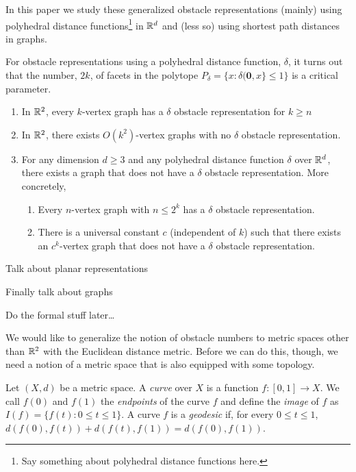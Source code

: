 \documentclass{patmorin}
\begin{document}
In this paper we study these generalized obstacle representations
(mainly) using polyhedral distance functions\footnote{Say something
about polyhedral distance functions here.} in $\mathbb{R}^d$ and (less so)
using shortest path distances in graphs.  

For obstacle representations using a polyhedral distance function, $\delta$,
it turns out that the number, $2k$, of facets in the polytope $P_\delta=\{ x: \delta(\mathbf{0},x\}\le 1\}$ is a critical parameter. 

\begin{enumerate}
  \item In $\mathbb{R}^2$, every $k$-vertex graph has a $\delta$ obstacle
  representation for $k\ge n$

  \item In $\mathbb{R}^2$, there exists $O(k^2)$-vertex graphs with no $\delta$
  obstacle representation.

  \item For any dimension $d\ge 3$ and any polyhedral distance function
  $\delta$ over $\mathbb{R}^d$, there exists a graph that does not have a $\delta$
  obstacle representation.  More concretely, 
  \begin{enumerate}
     \item Every $n$-vertex graph with $n\le 2^k$ has a $\delta$
     obstacle representation.
     \item There is a universal constant $c$ (independent of $k$) such
     that there exists an $c^k$-vertex graph that does not have a $\delta$
     obstacle representation.
  \end{enumerate}
\end{enumerate}

Talk about planar representations


Finally talk about graphs



Do the formal stuff later\ldots


We would like to generalize the notion of obstacle numbers to metric
spaces other than $\mathbb{R}^2$ with the Euclidean distance metric.  Before we
can do this, though, we need a notion of a metric space that is also
equipped with some topology.

Let $(X,d)$ be a metric space.  A \emph{curve} over $X$ is a function
$f:[0,1]\to X$.  We call $f(0)$ and $f(1)$ the \emph{endpoints} of the
curve $f$ and define the \emph{image} of $f$ as $I(f)=\{f(t):0\le t\le
1\}$.  A curve $f$ is a \emph{geodesic} if, for every $0\le t\le 1$,
$d(f(0),f(t)) + d(f(t),f(1)) = d(f(0),f(1))$.  
\end{document}
